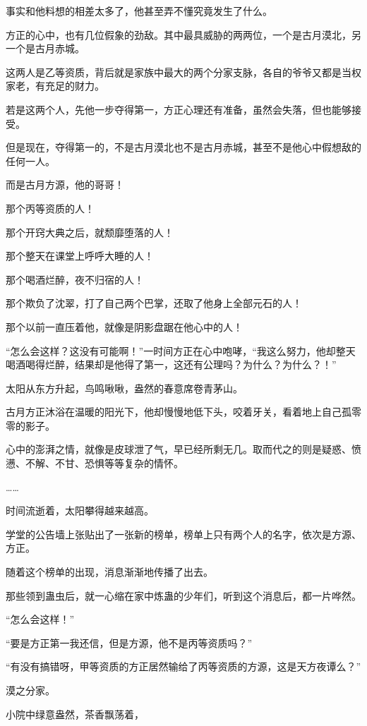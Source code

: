 \begin{this_body}
事实和他料想的相差太多了，他甚至弄不懂究竟发生了什么。

方正的心中，也有几位假象的劲敌。其中最具威胁的两两位，一个是古月漠北，另一个是古月赤城。

这两人是乙等资质，背后就是家族中最大的两个分家支脉，各自的爷爷又都是当权家老，有充足的财力。

若是这两个人，先他一步夺得第一，方正心理还有准备，虽然会失落，但也能够接受。

但是现在，夺得第一的，不是古月漠北也不是古月赤城，甚至不是他心中假想敌的任何一人。

而是古月方源，他的哥哥！

那个丙等资质的人！

那个开窍大典之后，就颓靡堕落的人！

那个整天在课堂上呼呼大睡的人！

那个喝酒烂醉，夜不归宿的人！

那个欺负了沈翠，打了自己两个巴掌，还取了他身上全部元石的人！

那个以前一直压着他，就像是阴影盘踞在他心中的人！

“怎么会这样？这没有可能啊！”一时间方正在心中咆哮，“我这么努力，他却整天喝酒喝得烂醉，结果却是他得了第一，这还有公理吗？为什么？为什么？！”

太阳从东方升起，鸟鸣啾啾，盎然的春意席卷青茅山。

古月方正沐浴在温暖的阳光下，他却慢慢地低下头，咬着牙关，看着地上自己孤零零的影子。

心中的澎湃之情，就像是皮球泄了气，早已经所剩无几。取而代之的则是疑惑、愤懑、不解、不甘、恐惧等等复杂的情怀。

……

时间流逝着，太阳攀得越来越高。

学堂的公告墙上张贴出了一张新的榜单，榜单上只有两个人的名字，依次是方源、方正。

随着这个榜单的出现，消息渐渐地传播了出去。

那些领到蛊虫后，就一心缩在家中炼蛊的少年们，听到这个消息后，都一片哗然。

“怎么会这样！”

“要是方正第一我还信，但是方源，他不是丙等资质吗？”

“有没有搞错呀，甲等资质的方正居然输给了丙等资质的方源，这是天方夜谭么？”

漠之分家。

小院中绿意盎然，茶香飘荡着，


\end{this_body}
